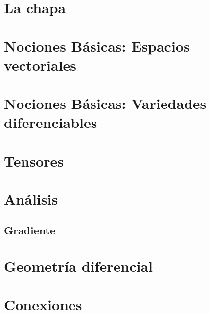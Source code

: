 \documentclass[11pt,fleqn]{book}
\begin{document}
  \printglossaries


  \chapter{La chapa}\label{ch:la-chapa}
  


  \chapter{Nociones Básicas: Espacios vectoriales}\label{ch:basico-espacio-vectorial}
  

  \chapter{Nociones Básicas: Variedades diferenciables}\label{ch:basico-variedad-diferencial}
  

  \chapter{Tensores}\label{ch:tensores}
  


  \chapter{Análisis}\label{ch:analisis}


  \section{Gradiente}\label{sec:gradiente}
  


  \chapter{Geometría diferencial}\label{ch:geometria-diferencial}
  


  \chapter{Conexiones}\label{ch:conexiones}
  

  
  
  
\end{document}
